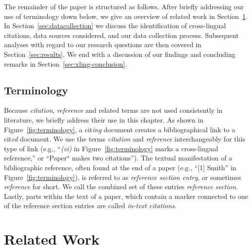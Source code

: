 \noindent The remainder of the paper is structured as follows. After briefly addressing our use of terminology down below, we give an overview of related work in Section~\ref{sec:relwork}. In Section~\ref{sec:datacollection} we discuss the identification of cross-lingual citations, data sources considered, and our data collection process. Subsequent analyses with regard to our research questions are then covered in Section~\ref{sec:results}. We end with a discussion of our findings and concluding remarks in Section~\ref{sec:xling-conclusion}.

\subsection*{Terminology}
Because \textit{citation}, \textit{reference} and related terms are not used consistently in literature, we briefly address their use in this chapter. As shown in Figure~\ref{fig:terminology}, a cit\emph{ing} document creates a bibliographical link to a cit\emph{ed} document. We use the terms \textit{citation} and \textit{reference} interchangeably for this type of link (e.g., ``\textit{(vi)} in Figure~\ref{fig:terminology} marks a cross-lingual reference,'' or ``Paper$^a$ makes two citations''). The textual manifestation of a bibliographic reference, often found at the end of a paper (e.g., ``[1] Smith'' in Figure~\ref{fig:terminology}), is referred to as \textit{reference section entry}, or sometimes \textit{reference} for short. We call the combined set of these entries \textit{reference section}. Lastly, parts within the text of a paper, which contain a marker connected to one of the reference section entries are called \textit{in-text citations}.

\section{Related Work}\label{sec:relwork}

